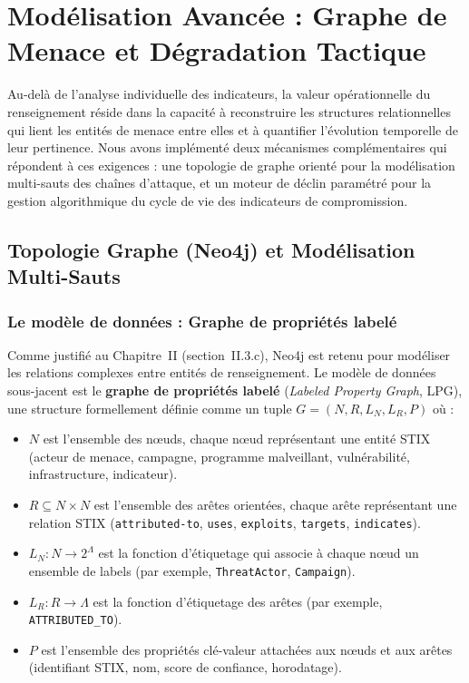 
\section{Modélisation Avancée : Graphe de Menace et Dégradation Tactique}

Au-delà de l'analyse individuelle des indicateurs, la valeur opérationnelle du renseignement réside dans la capacité à reconstruire les structures relationnelles qui lient les entités de menace entre elles et à quantifier l'évolution temporelle de leur pertinence. Nous avons implémenté deux mécanismes complémentaires qui répondent à ces exigences : une topologie de graphe orienté pour la modélisation multi-sauts des chaînes d'attaque, et un moteur de déclin paramétré pour la gestion algorithmique du cycle de vie des indicateurs de compromission.

\subsection{Topologie Graphe (Neo4j) et Modélisation Multi-Sauts}

\subsubsection{Le modèle de données : Graphe de propriétés labelé}

Comme justifié au Chapitre~II (section~II.3.c), Neo4j est retenu pour modéliser les relations complexes entre entités de renseignement. Le modèle de données sous-jacent est le \textbf{graphe de propriétés labelé} (\textit{Labeled Property Graph}, LPG), une structure formellement définie comme un tuple $G = (N, R, L_N, L_R, P)$ où :

\begin{itemize}
    \item $N$ est l'ensemble des n\oe uds, chaque n\oe ud représentant une entité STIX (acteur de menace, campagne, programme malveillant, vulnérabilité, infrastructure, indicateur).
    \item $R \subseteq N \times N$ est l'ensemble des arêtes orientées, chaque arête représentant une relation STIX (\texttt{attributed-to}, \texttt{uses}, \texttt{exploits}, \texttt{targets}, \texttt{indicates}).
    \item $L_N : N \rightarrow 2^{\Lambda}$ est la fonction d'étiquetage qui associe à chaque n\oe ud un ensemble de labels (par exemple, \texttt{ThreatActor}, \texttt{Campaign}).
    \item $L_R : R \rightarrow \Lambda$ est la fonction d'étiquetage des arêtes (par exemple, \texttt{ATTRIBUTED\_TO}).
    \item $P$ est l'ensemble des propriétés clé-valeur attachées aux n\oe uds et aux arêtes (identifiant STIX, nom, score de confiance, horodatage).
\end{itemize}

